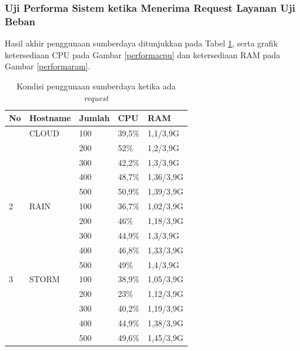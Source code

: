 			\subsubsection{Uji Performa Sistem ketika Menerima Request Layanan Uji Beban}

				Hasil akhir penggunaan sumberdaya ditunjukkan pada Tabel \ref{sdhasilperforma}, serta grafik ketersediaan CPU pada Gambar \ref{performacpu} dan ketersediaan RAM pada Gambar \ref{performaram}.
				\begin{longtable}{|p{}|p{}|p{}|p{}|p{}|}
					\caption{Kondisi penggunaan sumberdaya ketika ada \textit{request}} \label{sdhasilperforma} \\
					\hline
					\textbf{No} & \textbf{Hostname} & \textbf{Jumlah} & \textbf{CPU} & \textbf{RAM} \\ \hline
					\endhead
					\endfoot
					\endlastfoot
					1 & CLOUD & 100 & 39,5\% & 1,1/3,9G \\ \cline{3-5}
					&& 200 & 52\% & 1,2/3,9G \\ \cline{3-5}
					&& 300 & 42,2\% & 1,3/3,9G \\ \cline{3-5}
					&& 400 & 48,7\% & 1,36/3,9G \\ \cline{3-5}
					&& 500 & 50,9\% & 1,39/3,9G \\ \hline
					2 & RAIN & 100 & 36,7\% & 1,02/3,9G \\ \cline{3-5}
					&& 200 & 46\% & 1,18/3,9G \\ \cline{3-5}
					&& 300 & 44,9\% & 1,3/3,9G \\ \cline{3-5}
					&& 400 & 46,8\% & 1,33/3,9G \\ \cline{3-5}
					&& 500 & 49\% & 1,4/3,9G \\ \hline
					3 & STORM & 100 & 38,9\% & 1,05/3,9G \\ \cline{3-5}
					&& 200 & 23\% & 1,12/3,9G \\ \cline{3-5}
					&& 300 & 40,2\% & 1,19/3,9G \\ \cline{3-5}
					&& 400 & 44,9\% & 1,38/3,9G \\ \cline{3-5}
					&& 500 & 49,6\% & 1,45/3,9G \\ \hline
				\end{longtable}
			
